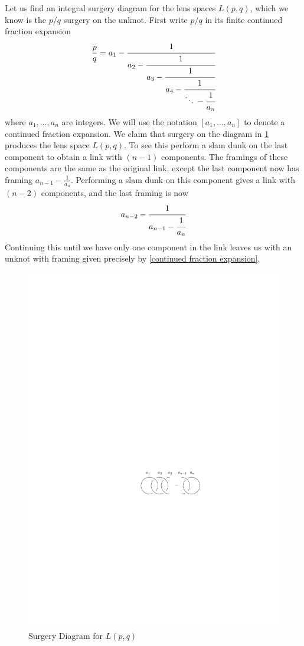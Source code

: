 \begin{example}
Let us find an integral surgery diagram for the lens spaces $L(p,q)$, which we know is the $p/q$ surgery on the unknot. First write $p/q$ in its finite continued fraction expansion
\begin{equation}
\label{continued fraction expansion}
\frac{p}{q} = a_1 - \cfrac{1}{a_2 - \cfrac{1}{a_3 - \cfrac{1}{a_4 - \cfrac{1}{\ddots\, - \cfrac{1}{a_n}}}}} 
\end{equation}
where $a_1,\ldots,a_n$ are integers. We will use the notation $[a_1,\ldots,a_n]$ to denote a continued fraction expansion. We claim that surgery on the diagram in \cref{lens-space-integral-surgery} produces the lens space $L(p,q)$. To see this perform a slam dunk on the last component to obtain a link with $(n-1)$ components. The framings of these components are the same as the original link, except the last component now has framing $a_{n-1} - \frac{1}{a_n}$. Performing a slam dunk on this component gives a link with $(n-2)$ components, and the last framing is now
\[ a_{n-2} - \cfrac{1}{a_{n-1} - \cfrac{1}{a_n}} \]
Continuing this until we have only one component in the link leaves us with an unknot with framing given precisely by \eqref{continued fraction expansion}.

\begin{figure}[tb]
\centering
\includegraphics[scale=1]{graphics/lens-space-integral-surgery}
\caption{Surgery Diagram for $L(p,q)$}
\label{lens-space-integral-surgery}
\end{figure}

\end{example}
